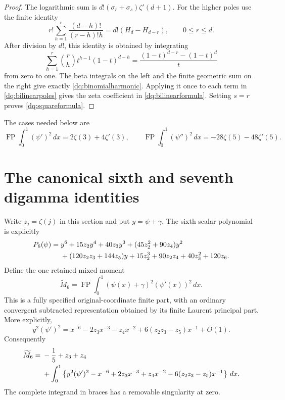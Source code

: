 \documentclass[11pt,a4paper]{article}
\numberwithin{equation}{section}
\theoremstyle{plain}
\theoremstyle{definition}
\theoremstyle{remark}
\begin{document}
\begin{proof}
The logarithmic sum is $d!(\sigma_r+\sigma_s)\zeta'(d+1)$.
For the higher poles use the finite identity
\begin{equation}\label{dq:binomialharmonic}
 r!\sum_{h=1}^r\frac{(d-h)!}{(r-h)!h}
                 =d!(H_d-H_{d-r}),\qquad0\le r\le d.
\end{equation}
After division by $d!$, this identity is obtained by integrating
\[
 \sum_{h=1}^r\binom rh t^{h-1}(1-t)^{d-h}
       =\frac{(1-t)^{d-r}-(1-t)^d}{t}
\]
from zero to one. The beta integrals on the left and the finite
geometric sum on the right give exactly \eqref{dq:binomialharmonic}.
Applying it once to each term in \eqref{dq:bilinearpoles} gives
the zeta coefficient in \eqref{dq:bilinearformula}. Setting $s=r$
proves \eqref{dq:squareformula}.
\end{proof}

The cases needed below are
\begin{equation}\label{dq:twosquares}
 \operatorname{FP}\int_0^1(\psi')^2\,dx=2\zeta(3)+4\zeta'(3),
 \qquad
 \operatorname{FP}\int_0^1(\psi'')^2\,dx=-28\zeta(5)-48\zeta'(5).
\end{equation}

\section{The canonical sixth and seventh digamma identities}
\label{dq:sixthsection}

Write $z_j=\zeta(j)$ in this section and put $y=\psi+\gamma$.
The sixth scalar polynomial is explicitly
\begin{align}
 P_6(\psi)={}&y^6+15z_2y^4+40z_3y^3
          +(45z_2^2+90z_4)y^2\notag\\
 &+(120z_2z_3+144z_5)y
     +15z_2^3+90z_2z_4+40z_3^2+120z_6.
 \label{dq:P6}
\end{align}
Define the one retained mixed moment
\begin{equation}\label{dq:M6}
 \widetilde M_6=\operatorname{FP}\int_0^1
                          (\psi(x)+\gamma)^2(\psi'(x))^2\,dx.
\end{equation}
This is a fully specified original-coordinate finite part, with an
ordinary convergent subtracted representation obtained by its finite
Laurent principal part.
More explicitly,
\begin{equation}\label{dq:M6principal}
 y^2(\psi')^2=x^{-6}-2z_3x^{-3}-z_4x^{-2}
                 +6(z_2z_3-z_5)x^{-1}+O(1).
\end{equation}
Consequently
\begin{align}
 \widetilde M_6={}&-\frac15+z_3+z_4\notag\\
 &+\int_0^1\left\{y^2(\psi')^2-x^{-6}+2z_3x^{-3}
         +z_4x^{-2}-6(z_2z_3-z_5)x^{-1}\right\}\,dx.
 \label{dq:M6ordinary}
\end{align}
The complete integrand in braces has a removable singularity at zero.
\end{document}
